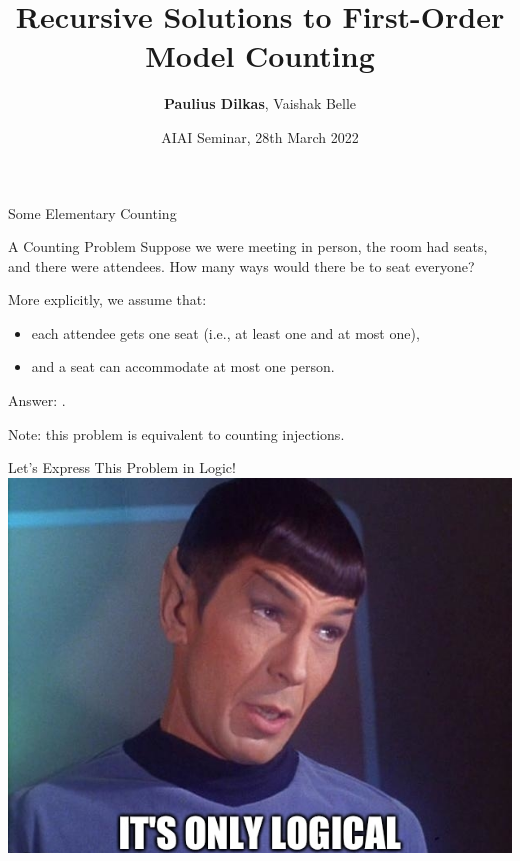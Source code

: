 \documentclass{beamer}
\author[Paulius Dilkas]{\textbf{Paulius Dilkas}, Vaishak Belle}
\title[Recursive Solutions to FOMC]{Recursive Solutions to First-Order Model Counting}
\date{AIAI Seminar, 28th March 2022}
\begin{document}

\maketitle

\begin{frame}{Some Elementary Counting}
  \begin{block}{A Counting Problem}
    Suppose we were meeting in person, the room had  seats, and there were  attendees. How many ways would there be to seat everyone?
  \end{block}

  \pause
  More explicitly, we assume that:
  \begin{itemize}
  \item each attendee gets one seat (i.e., at least one \alert{and} at most one),
  \item and a seat can accommodate at most one person.
  \end{itemize}

  \pause
  \alert{Answer:} .

  Note: this problem is equivalent to counting \structure{$[m] \to [n]$} injections.

\end{frame}

\begin{frame}{Let's Express This Problem in Logic!}
  \centering
  \includegraphics[height=0.8\textheight]{spock.jpg}
\end{frame}
\end{document}
